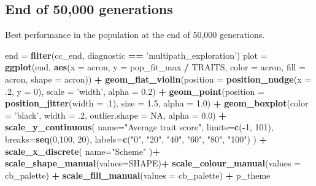 \documentclass[]{book}
\newenvironment{Shaded}{\begin{snugshade}}{\end{snugshade}}
\newcommand{\DataTypeTok}[1]{\textcolor[rgb]{0.13,0.29,0.53}{#1}}
\newcommand{\DecValTok}[1]{\textcolor[rgb]{0.00,0.00,0.81}{#1}}
\newcommand{\FloatTok}[1]{\textcolor[rgb]{0.00,0.00,0.81}{#1}}
\newcommand{\KeywordTok}[1]{\textcolor[rgb]{0.13,0.29,0.53}{\textbf{#1}}}
\newcommand{\NormalTok}[1]{#1}
\newcommand{\OperatorTok}[1]{\textcolor[rgb]{0.81,0.36,0.00}{\textbf{#1}}}
\newcommand{\OtherTok}[1]{\textcolor[rgb]{0.56,0.35,0.01}{#1}}
\newcommand{\StringTok}[1]{\textcolor[rgb]{0.31,0.60,0.02}{#1}}
\begin{document}
\hypertarget{end-of-50000-generations-4}{%
\subsection{End of 50,000 generations}\label{end-of-50000-generations-4}}

Best performance in the population at the end of 50,000 generations.

\begin{Shaded}
\begin{Highlighting}[]
\NormalTok{end =}\StringTok{ }\KeywordTok{filter}\NormalTok{(cc_end, diagnostic }\OperatorTok{==}\StringTok{ 'multipath_exploration'}\NormalTok{)}
\NormalTok{plot =}\StringTok{ }\KeywordTok{ggplot}\NormalTok{(end, }\KeywordTok{aes}\NormalTok{(}\DataTypeTok{x =}\NormalTok{ acron, }\DataTypeTok{y =}\NormalTok{ pop_fit_max }\OperatorTok{/}\StringTok{ }\NormalTok{TRAITS, }\DataTypeTok{color =}\NormalTok{ acron, }\DataTypeTok{fill =}\NormalTok{ acron, }\DataTypeTok{shape =}\NormalTok{ acron)) }\OperatorTok{+}
\StringTok{  }\KeywordTok{geom_flat_violin}\NormalTok{(}\DataTypeTok{position =} \KeywordTok{position_nudge}\NormalTok{(}\DataTypeTok{x =} \FloatTok{.2}\NormalTok{, }\DataTypeTok{y =} \DecValTok{0}\NormalTok{), }\DataTypeTok{scale =} \StringTok{'width'}\NormalTok{, }\DataTypeTok{alpha =} \FloatTok{0.2}\NormalTok{) }\OperatorTok{+}
\StringTok{  }\KeywordTok{geom_point}\NormalTok{(}\DataTypeTok{position =} \KeywordTok{position_jitter}\NormalTok{(}\DataTypeTok{width =} \FloatTok{.1}\NormalTok{), }\DataTypeTok{size =} \FloatTok{1.5}\NormalTok{, }\DataTypeTok{alpha =} \FloatTok{1.0}\NormalTok{) }\OperatorTok{+}
\StringTok{  }\KeywordTok{geom_boxplot}\NormalTok{(}\DataTypeTok{color =} \StringTok{'black'}\NormalTok{, }\DataTypeTok{width =} \FloatTok{.2}\NormalTok{, }\DataTypeTok{outlier.shape =} \OtherTok{NA}\NormalTok{, }\DataTypeTok{alpha =} \FloatTok{0.0}\NormalTok{) }\OperatorTok{+}
\StringTok{  }\KeywordTok{scale_y_continuous}\NormalTok{(}
    \DataTypeTok{name=}\StringTok{"Average trait score"}\NormalTok{,}
    \DataTypeTok{limits=}\KeywordTok{c}\NormalTok{(}\OperatorTok{-}\DecValTok{1}\NormalTok{, }\DecValTok{101}\NormalTok{),}
    \DataTypeTok{breaks=}\KeywordTok{seq}\NormalTok{(}\DecValTok{0}\NormalTok{,}\DecValTok{100}\NormalTok{, }\DecValTok{20}\NormalTok{),}
    \DataTypeTok{labels=}\KeywordTok{c}\NormalTok{(}\StringTok{"0"}\NormalTok{, }\StringTok{"20"}\NormalTok{, }\StringTok{"40"}\NormalTok{, }\StringTok{"60"}\NormalTok{, }\StringTok{"80"}\NormalTok{, }\StringTok{"100"}\NormalTok{)}
\NormalTok{  ) }\OperatorTok{+}
\StringTok{  }\KeywordTok{scale_x_discrete}\NormalTok{(}
    \DataTypeTok{name=}\StringTok{"Scheme"}
\NormalTok{  )}\OperatorTok{+}
\StringTok{  }\KeywordTok{scale_shape_manual}\NormalTok{(}\DataTypeTok{values=}\NormalTok{SHAPE)}\OperatorTok{+}
\StringTok{  }\KeywordTok{scale_colour_manual}\NormalTok{(}\DataTypeTok{values =}\NormalTok{ cb_palette) }\OperatorTok{+}
\StringTok{  }\KeywordTok{scale_fill_manual}\NormalTok{(}\DataTypeTok{values =}\NormalTok{ cb_palette) }\OperatorTok{+}
\StringTok{  }\NormalTok{p_theme}


\end{Highlighting}
\end{Shaded}
\end{document}
